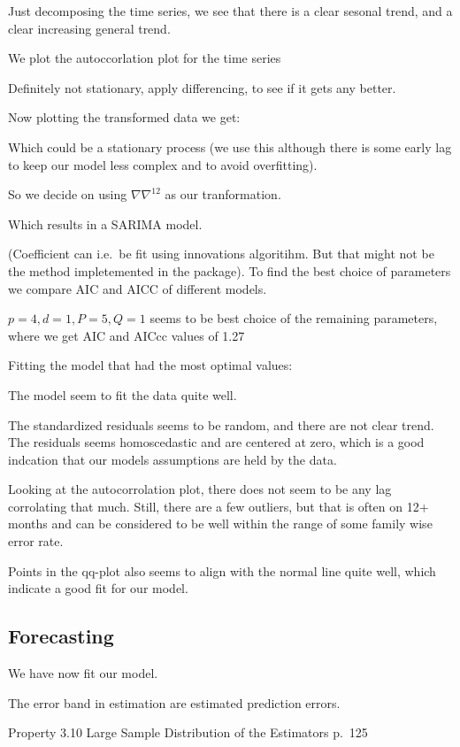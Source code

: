 \documentclass[]{article}
\begin{document}
Just decomposing the time series, we see that there is a clear sesonal
trend, and a clear increasing general trend.

We plot the autoccorlation plot for the time series

Definitely not stationary, apply differencing, to see if it gets any
better.

Now plotting the transformed data we get:

Which could be a stationary process (we use this although there is some
early lag to keep our model less complex and to avoid overfitting).

So we decide on using \(\nabla\nabla^{12}\) as our tranformation.

Which results in a SARIMA model.

(Coefficient can i.e.~be fit using innovations algoritihm. But that
might not be the method impletemented in the package). To find the best
choice of parameters we compare AIC and AICC of different models.

\(p=4, d=1, P=5, Q=1\) seems to be best choice of the remaining
parameters, where we get AIC and AICcc values of 1.27

Fitting the model that had the most optimal values:

The model seem to fit the data quite well.

The standardized residuals seems to be random, and there are not clear
trend. The residuals seems homoscedastic and are centered at zero, which
is a good indcation that our models assumptions are held by the data.

Looking at the autocorrolation plot, there does not seem to be any lag
corrolating that much. Still, there are a few outliers, but that is
often on 12+ months and can be considered to be well within the range of
some family wise error rate.

Points in the qq-plot also seems to align with the normal line quite
well, which indicate a good fit for our model.

\hypertarget{forecasting}{%
\subsection{Forecasting}\label{forecasting}}

We have now fit our model.

The error band in estimation are estimated prediction errors.

Property 3.10 Large Sample Distribution of the Estimators p.~125
\end{document}
